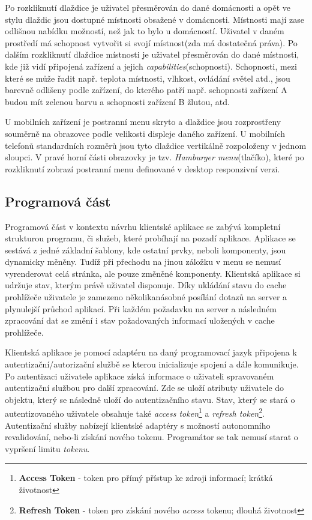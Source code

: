 Po rozkliknutí dlaždice je uživatel přesměrován do dané domácnosti a opět ve stylu dlaždic jsou dostupné místnosti obsažené v domácnosti.
Místnosti mají zase odlišnou nabídku možností, než jak to bylo u domácností.
Uživatel v daném prostředí má schopnost vytvořit si svojí místnost(zda má dostatečná práva).
Po dalším rozkliknutí dlaždice místnosti je uživatel přesměrován do dané místnosti, kde již vidí připojená zařízení a jejich \emph{capabilities}(schopnosti).
Schopnosti, mezi které se může řadit např. teplota místnosti, vlhkost, ovládání světel atd., jsou barevně odlišeny podle zařízení, do kterého patří např. schopnosti zařízení A budou mít zelenou barvu a schopnosti zařízení B žlutou, atd.

U mobilních zařízení je postranní menu skryto a dlaždice jsou rozprostřeny souměrně na obrazovce podle velikosti displeje daného zařízení.
U mobilních telefonů standardních rozměrů jsou tyto dlaždice vertikálně rozpoloženy v jednom sloupci.
V pravé horní části obrazovky je tzv. \emph{Hamburger menu}(tlačíko), které po rozkliknutí zobrazí postranní menu definované v desktop responzivní verzi.

\subsection*{Programová část}
\label{frontend:program}
Programová část v kontextu návrhu klientské aplikace se zabývá kompletní strukturou programu, či služeb, které probíhají na pozadí aplikace.
Aplikace se sestává z jedné základní šablony, kde ostatní prvky, neboli komponenty, jsou dynamicky měněny.
Tudíž při přechodu na jinou záložku v menu se nemusí vyrenderovat celá stránka, ale pouze změněné komponenty.
Klientská aplikace si udržuje stav, kterým právě uživatel disponuje.
Díky ukládání stavu do cache prohlížeče uživatele je zamezeno několikanásobné posílání dotazů na server a plynulejší průchod aplikací.
Při každém požadavku na server a následném zpracování dat se změní i stav požadovaných informací uložených v cache prohlížeče.

Klientská aplikace je pomocí adaptéru na daný programovací jazyk připojena k autentizační/autorizační službě se kterou inicializuje spojení a dále komunikuje.
Po autentizaci uživatele aplikace získá informace o uživateli spravovaném autentizační službou pro další zpracování.
Zde se uloží atributy uživatele do objektu, který se následně uloží do autentizačního stavu.
Stav, který se stará o autentizovaného uživatele obsahuje také \emph{access token}\footnote{\textbf{Access Token} - token pro přímý přístup ke zdroji informací; krátká životnost} a \emph{refresh token}\footnote{\textbf{Refresh Token} - token pro získání nového \emph{access} tokenu; dlouhá životnost}.
Autentizační služby nabízejí klientské adaptéry s možností autonomního revalidování, nebo-li získání nového tokenu.
Programátor se tak nemusí starat o vypršení limitu \emph{tokenu}.


